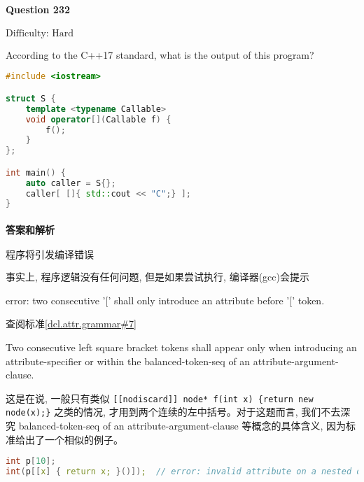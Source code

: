 \documentclass{article}
\begin{document}
	\paragraph*{Question 232} $\boxed{\text{Difficulty: Hard}} $			
	
	According to the C++17 standard, what is the output of this program?
	
	\begin{lstlisting}[language=C++]  		
#include <iostream>

struct S {
	template <typename Callable>
	void operator[](Callable f) {
		f();
	}
};

int main() {
	auto caller = S{};
	caller[ []{ std::cout << "C";} ];
}
	\end{lstlisting}
	
	\paragraph*{答案和解析} $\boxed{\text{程序将引发编译错误}} $
	
	事实上, 程序逻辑没有任何问题, 但是如果尝试执行, 编译器(gcc)会提示
	
	error: two consecutive '[' shall only introduce an attribute before '[' token.
	
	查阅标准\href{https://timsong-cpp.github.io/cppwp/n4659/dcl.attr.grammar#7}{[dcl.attr.grammar\#7]}
	
	\begin{lightgrayleftbar}
		Two consecutive left square bracket tokens shall appear only when introducing an attribute-specifier or within the balanced-token-seq of an attribute-argument-clause.
	\end{lightgrayleftbar}

	这是在说, 一般只有类似 \verb|[[nodiscard]] node* f(int x) {return new node(x);}| 之类的情况, 才用到两个连续的左中括号。对于这题而言, 我们不去深究 balanced-token-seq of an attribute-argument-clause 等概念的具体含义, 因为标准给出了一个相似的例子。
	
	\begin{lstlisting}[language=C++]
int p[10];
int(p[[x] { return x; }()]);  // error: invalid attribute on a nested declarator-id and not a function-style cast of an element of p.
	\end{lstlisting}
\end{document}
